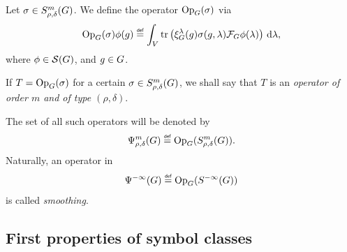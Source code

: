 \begin{definition}
\label{definition:operator_classes}
    Let $\sigma \in S^{m}_{\rho, \delta}(G)$.
    We define the operator $\mathrm{Op}_{G}(\sigma)$ via
    \begin{align*}
        \Op(\sigma) \phi(g) \defeq
        \int_\VectorSpace
            \tr\left(\Rep\lambda(g) \sigma(g, \lambda) \Fourier \phi(\lambda)\right)
        \dd \lambda,
    \end{align*}
    where $\phi \in {\mathcal{S} (G)}$, and $g \in G$.


    If $T = \mathrm{Op}_{G}(\sigma)$ for a certain $\sigma \in S^{m}_{\rho, \delta}(G)$,
    we shall say that $T$ is an \emph{operator of order $m$ and of type $(\rho, \delta)$}.

    The set of all such operators will be denoted by
    \begin{align*}
        \OperatorClass{m}{\rho, \delta} \defeq \Op(\SymbolClass{m}{\rho, \delta}).
    \end{align*}
    Naturally, an operator in
    \begin{align*}
        \SmoothingOperators \defeq \Op(\SmoothingSymbols)
    \end{align*}
    is called \emph{smoothing}.
\end{definition}

\subsection{First properties of symbol classes}

